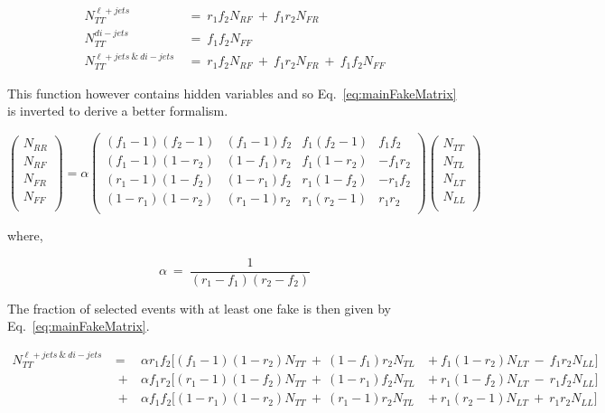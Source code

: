 \begin{align} \label{eq:multijet}
   N^{\ell+jets}_{TT}~&=~r_{1}f_{2}N_{RF}~+~f_{1}r_{2}N_{FR} \nonumber \\
   N^{di-jets}_{TT}~&=~f_{1}f_{2}N_{FF} \nonumber \\
   N^{\ell+jets~\&~di-jets}_{TT}~&=~r_{1}f_{2}N_{RF}~+~f_{1}r_{2}N_{FR}~+~f_{1}f_{2}N_{FF} 
\end{align}

This function however contains hidden variables and so Eq.~\ref{eq:mainFakeMatrix} is inverted to derive a better formalism.

\begin{equation}
   \begin{pmatrix}
      N_{RR} \\
      N_{RF} \\
      N_{FR} \\
      N_{FF} \\
   \end{pmatrix}
   = \alpha
   \begin{pmatrix}
      (f_{1}-1)(f_{2}-1) & (f_{1}-1)f_{2} & f_{1}(f_{2}-1) & f_{1}f_{2} \\
      (f_{1}-1)(1-r_{2}) & (1-f_{1})r_{2} & f_{1}(1-r_{2}) & -f_{1}r_{2} \\
      (r_{1}-1)(1-f_{2}) & (1-r_{1})f_{2} & r_{1}(1-f_{2}) & -r_{1}f_{2} \\
      (1-r_{1})(1-r_{2}) & (r_{1}-1)r_{2} & r_{1}(r_{2}-1) & r_{1}r_{2} \\
   \end{pmatrix}
   \begin{pmatrix}
      N_{TT} \\
      N_{TL} \\
      N_{LT} \\
      N_{LL} \\
   \end{pmatrix}
\end{equation}

where,

\begin{equation}
   \alpha~=~\frac{1}{(r_{1}-f_{1})(r_{2}-f_{2})}
\end{equation}

The fraction of selected events with at least one fake is then given by Eq.~\ref{eq:mainFakeMatrix}.

\begin{equation}
\begin{aligned}
   N^{\ell+jets~\&~di-jets}_{TT}~&=&~\alpha r_{1}f_{2}[(f_{1}-1)(1-r_{2})N_{TT}~+~(1-f_{1})r_{2}N_{TL}~&+~f_{1}(1-r_{2})N_{LT}~-~f_{1}r_{2}N_{LL}] \\
      &~+&~\alpha f_{1}r_{2}[(r_{1}-1)(1-f_{2})N_{TT}~+~(1-r_{1})f_{2}N_{TL}~&+~r_{1}(1-f_{2})N_{LT}~-~r_{1}f_{2}N_{LL}] \\
      &~+&~\alpha f_{1}f_{2}[(1-r_{1})(1-r_{2})N_{TT}~+~(r_{1}-1)r_{2}N_{TL}~&+~r_{1}(r_{2}-1)N_{LT}~+~r_{1}r_{2}N_{LL}] 
\end{aligned}
\end{equation}

